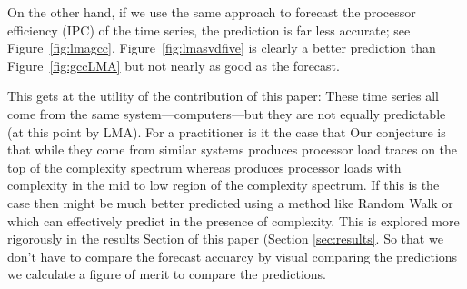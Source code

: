 %
%
%
On the other hand, if we use the same approach to forecast the
processor efficiency (IPC) of the \gcc time series, the
prediction is far less accurate; see Figure~\ref{fig:lmagcc}.
Figure~\ref{fig:lmasvdfive} is clearly a better prediction than Figure~\ref{fig:gccLMA} but not nearly as good as the \col forecast.


This gets at the utility of the contribution of this paper: These time series all come from the same system---computers---but they are not equally predictable (at this point by LMA). For a practitioner is it the case that 
  Our
conjecture is that while they come from similar systems \gcc produces processor load traces on the top of the complexity spectrum whereas \col produces processor loads with complexity in the mid to low region of the complexity spectrum. If this is the case then \gcc might be much better predicted using a method like Random Walk or \naive which can effectively predict in the presence of complexity. This is explored more rigorously in the results Section of this paper (Section \ref{sec:results}. So that we don't have to compare the forecast accuarcy by visual comparing the predictions we calculate a figure of merit to compare the predictions. 






